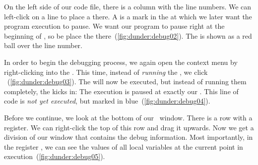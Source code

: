 On the left side of our code file, there is a column with the line numbers.
We can left-click on a line to place a  there.
A  is a mark in the  at which we later want the program execution to pause.
We want our program to pause right at the beginning of , so be place the  there~(\cref{fig:dunder:debug02}).
The  is shown as a red ball over the line number.

In order to begin the debugging process, we again open the context menu by right-clicking into the .
This time, instead of \emph{running} the , we click ~(\cref{fig:dunder:debug03}).
The  will now be executed, but instead of running them completely, the  kicks in:
The execution is paused at exactly our .
This line of code is \emph{not yet executed}, but marked in blue~(\cref{fig:dunder:debug04}).

Before we continue, we look at the bottom of our \pycharm\ window.
There is a row with a  register.
We can right-click the top of this row and drag it upwards.
Now we get a division of our window that contains the debug information.
Most importantly, in the register , we can see the values of all local variables at the current point in execution~(\cref{fig:dunder:debug05}).

